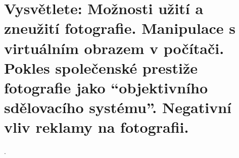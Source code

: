\section{Vysvětlete: Možnosti užití a zneužití fotografie. Manipulace s virtuálním obrazem v počítači. Pokles 
společenské prestiže fotografie jako \enquote{objektivního sdělovacího systému}. Negativní vliv reklamy na fotografii.}.
